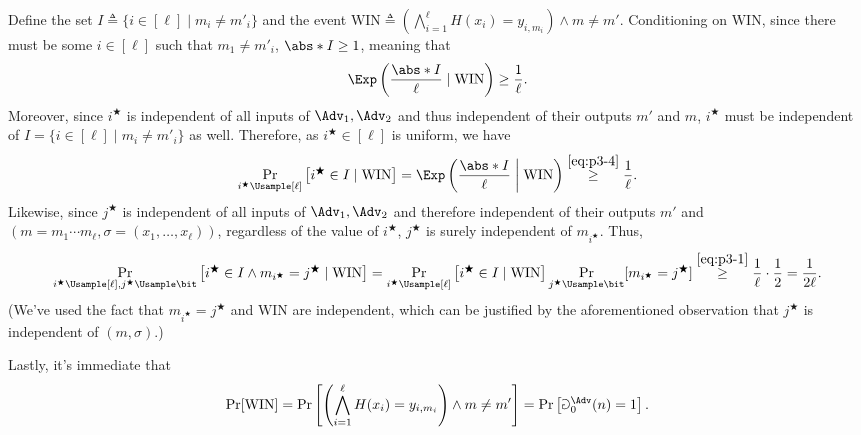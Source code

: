 \begin{answer}
    Define the set $I\triangleq \{i\in [\ell] \mid m_i\neq m'_i\}$ and the event $\textrm{WIN} \triangleq \left( \bigwedge_{i=1}^\ell H(x_i)=y_{i, m_i} \right) \land m\neq m'$. Conditioning on $\textrm{WIN}$, since there must be some $i\in [\ell]$ such that $m_1\neq m'_i$, $\abs*{I}\ge 1$, meaning that 
    \begin{equation}\label{eq:p3-4}
        \Exp\left(\frac{\abs*{I}}{\ell} \mid \textrm{WIN}\right)\ge \frac{1}{\ell}.
    \end{equation}
    Moreover, since $i^\bigstar$ is independent of all inputs of $\Adv_1, \Adv_2$ and thus independent of their outputs $m'$ and $m$, $i^\bigstar$ must be independent of  $I=\{i\in [\ell] \mid m_i\neq m'_i\}$ as well. Therefore, as $i^\bigstar\in [\ell]$ is uniform, we have
    \begin{equation}\label{eq:p3-1}
        \Pr_{i^\bigstar\Usample [\ell]}\left[i^\bigstar \in I \mid \textrm{WIN}\right]
        = \Exp\left(\frac{\abs*{I}}{\ell}\biggm\vert \textrm{WIN}  \right)
        \stackrel{\eqref{eq:p3-4}}\ge \frac{1}{\ell}.
    \end{equation}
    Likewise, since $j^\bigstar$ is independent of all inputs of $\Adv_1, \Adv_2$ and therefore independent of their outputs $m'$ and $(m=m_1\cdots m_\ell, \sigma=(x_1,\ldots, x_\ell))$, regardless of the value of $i^\bigstar$, $j^\bigstar$ is surely independent of $m_{i^\bigstar}$. Thus,
    \begin{equation}\label{eq:p3-2}
        \Pr_{i^\bigstar\Usample [\ell], j^\bigstar\Usample\bit}\left[i^\bigstar \in I \land m_{i^\bigstar}=j^\bigstar\mid \textrm{WIN}\right]
        = \Pr_{i^\bigstar\Usample [\ell]}\left[i^\bigstar \in I \mid \textrm{WIN}\right]\Pr_{j^\bigstar\Usample\bit}[m_{i^\bigstar}=j^\bigstar]
        \stackrel{\eqref{eq:p3-1}}\ge \frac{1}{\ell}\cdot \frac{1}{2}=\frac{1}{2\ell}.
    \end{equation}
    (We've used the fact that $m_{i^\bigstar}=j^\bigstar$ and $\textrm{WIN}$ are independent, which can be justified by the aforementioned observation that $j^\bigstar$ is independent of $(m, \sigma)$.)

    Lastly, it's immediate that
    \begin{equation}\label{eq:p3-3}
        \Pr[\textrm{WIN}]
        =\Pr\left[\left( \bigwedge_{i=1}^\ell H(x_i)=y_{i, m_i} \right) \land m\neq m'\right]
        =\Pr\left[\Game_0^\Adv(n)=1  \right].
    \end{equation}


\end{answer}
